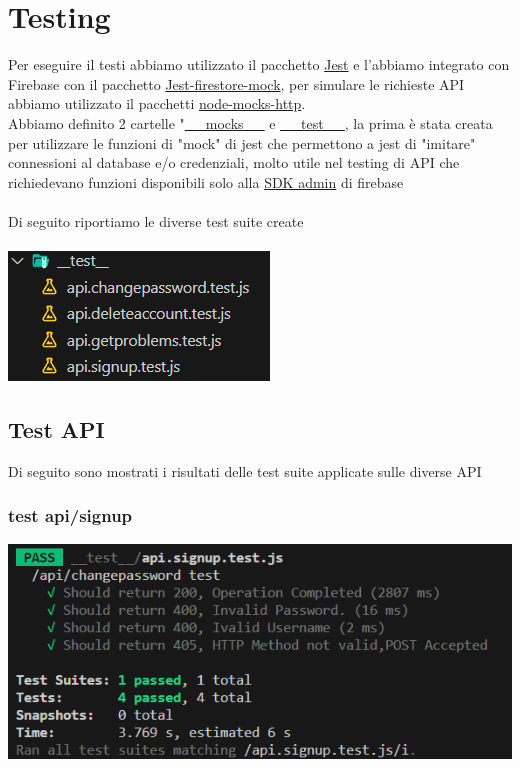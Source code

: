 \documentclass[11pt, a4paper]{article}
\theoremstyle{definition}
\begin{document}
\section{Testing}
Per eseguire il testi abbiamo utilizzato il pacchetto \href{https://jestjs.io/}{Jest} e l'abbiamo integrato con Firebase con il pacchetto \href{https://www.npmjs.com/package/firestore-jest-mock}{Jest-firestore-mock}, per simulare le richieste API abbiamo
utilizzato il pacchetti \href{https://www.npmjs.com/package/node-mocks-http}{node-mocks-http}.\\
Abbiamo definito 2 cartelle "\href{https://github.com/G17-UniTn/CodeBase/tree/master/__mocks__}{\_\_mocks\_\_} e \href{https://github.com/G17-UniTn/CodeBase/tree/master/__test__}{\_\_test\_\_}, la prima è stata creata per utilizzare le funzioni di "mock" di jest 
che permettono a jest di "imitare" connessioni al database e/o credenziali, molto utile nel testing di API che richiedevano funzioni disponibili solo alla \href{https://firebase.google.com/docs/reference/admin}{SDK admin} di firebase
\\\\
Di seguito riportiamo le diverse test suite create\\\\
\includegraphics[width=\textwidth]{materiale/testing/test-overview.png}
\subsection{Test API}
Di seguito sono mostrati i risultati delle test suite applicate sulle diverse API
\subsubsection{test api/signup}
\includegraphics[width=\textwidth]{materiale/testing/Signup.png}
\end{document}
